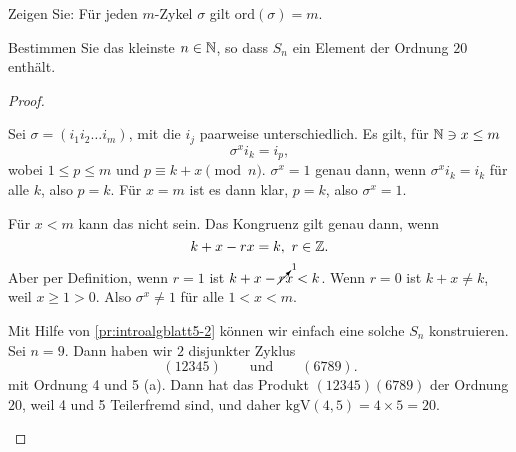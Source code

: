 \begin{Problem}
	\begin{parts}
	\item Zeigen Sie: F\"{u}r jeden $m$-Zykel $\sigma$ gilt $\text{ord}(\sigma)=m$.
	\item Bestimmen Sie das kleinste $n\in \mathbb{N}$, so dass $S_n$ ein Element der Ordnung $20$ enthält.
	\end{parts}
\end{Problem}
\begin{proof}
	\begin{parts}
	\item Sei $\sigma=(i_1i_2\dots i_m)$, mit die $i_j$ paarweise unterschiedlich. Es gilt, f\"{u}r $\mathbb{N}\ni x\le m$
		\[
		\sigma^x i_k=i_p
		,\] 
		wobei $1\le p \le m$ und $p\equiv k+x\pmod{n}$. $\sigma^x=1$ genau dann, wenn $\sigma^x i_k=i_k$ f\"{u}r alle $k$, also $p=k$. F\"{u}r $x=m$ ist es dann klar, $p=k$, also $\sigma^x=1$. 

		F\"{u}r $x < m$ kann das nicht sein. Das Kongruenz gilt genau dann, wenn
		\[
		k+x-rx=k,~r\in \mathbb{Z}
		.\] 
		Aber per Definition, wenn $r=1$ ist $k+x-\cancelto{1}{r}x<k$. Wenn $r=0$ ist $k+x\neq k$, weil $x\ge 1>0$. Also $\sigma^x\neq 1$ f\"{u}r alle $1 < x < m$.
	\item Mit Hilfe von \ref{pr:introalgblatt5-2} können wir einfach eine solche $S_n$ konstruieren. Sei $n=9$. Dann haben wir $2$ disjunkter Zyklus
		\[
			(12345)\qquad\text{und}\qquad(6789)
		.\] 
		mit Ordnung 4 und 5 (a). Dann hat das Produkt $(12345)(6789)$ der Ordnung $20$, weil 4 und 5 Teilerfremd sind, und daher $\text{kgV}(4,5)=4\times 5=20$.


\end{parts}
\end{proof}

